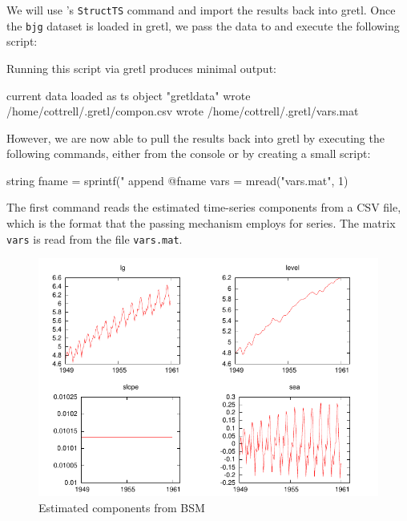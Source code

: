We will use 's \texttt{StructTS} command and import the results
back into gretl. Once the \texttt{bjg} dataset is loaded in gretl, we
pass the data to  and execute the following script:

Running this script via gretl produces minimal output:
\begin{code}
current data loaded as ts object "gretldata"
wrote /home/cottrell/.gretl/compon.csv 
wrote /home/cottrell/.gretl/vars.mat 
\end{code}
However, we are now able to pull the results back into gretl by
executing the following commands, either from the console or by
creating a small script:
\begin{code}
string fname = sprintf("%
append @fname
vars = mread("vars.mat", 1)
\end{code}
The first command reads the estimated time-series components from a
CSV file, which is the format that the passing mechanism employs for
series. The matrix \texttt{vars} is read from the file
\texttt{vars.mat}.

\begin{figure}[htbp]
  \centering
  \includegraphics{figures/BSM-output}
  \caption{Estimated components from BSM}
  \label{fig:BSM-output}
\end{figure}

